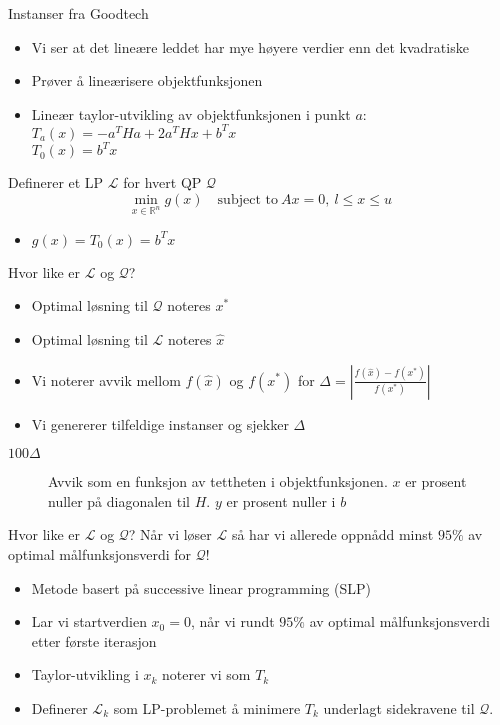 \documentclass{beamer}
\begin{document}
\begin{frame}{Instanser fra Goodtech}
\begin{itemize}
\item Vi ser at det lineære leddet har mye høyere verdier enn det kvadratiske
\item Prøver å lineærisere objektfunksjonen
\item Lineær taylor-utvikling av objektfunksjonen i punkt $a$: \\
      $T_a(x) = -a^T H a + 2a^T H x + b^T x$ \\
      $T_0(x) = b^T x$
\end{itemize}
Definerer et LP $\mathcal{L}$ for hvert QP $\mathcal{Q}$
\[
\min_{x \in \mathbb{R}^n} g(x) \quad \textrm{subject to} ~ Ax = 0, ~ l \leq x \leq u
\]
\begin{itemize}
\item $g(x) = T_0(x) = b^T x$
\end{itemize}
\end{frame}



\begin{frame}{Hvor like er $\mathcal{L}$ og $\mathcal{Q}$?}
\begin{itemize}
\item Optimal løsning til $\mathcal{Q}$ noteres $x^*$
\item Optimal løsning til $\mathcal{L}$ noteres $\hat{x}$
\item Vi noterer avvik mellom $f(\hat{x})$ og $f(x^*)$ for
      $\Delta = \left| \frac{f(\hat{x}) - f(x^*)}{f(x^*)} \right|$
\item Vi genererer tilfeldige instanser og sjekker $\Delta$
\end{itemize}
\end{frame}



\begin{frame}{$100\Delta$}
\begin{figure}[ht!]

\caption{Avvik som en funksjon av tettheten i objektfunksjonen. $x$ er prosent
         nuller på diagonalen til $H$. $y$ er prosent nuller i $b$}
\end{figure}
\end{frame}



\begin{frame}{Hvor like er $\mathcal{L}$ og $\mathcal{Q}$?}
Når vi løser $\mathcal{L}$ så har vi allerede oppnådd minst $95\%$ av optimal
målfunksjonsverdi for $\mathcal{Q}$!
\begin{itemize}
\item Metode basert på successive linear programming (SLP)
\item Lar vi startverdien $x_0 = 0$, når vi rundt $95\%$ av optimal målfunksjonsverdi etter
      første iterasjon
\item Taylor-utvikling i $x_k$ noterer vi som $T_k$
\item Definerer $\mathcal{L}_k$ som LP-problemet å minimere $T_k$ underlagt
      sidekravene til $\mathcal{Q}$.
\end{itemize}
\end{frame}
\end{document}
